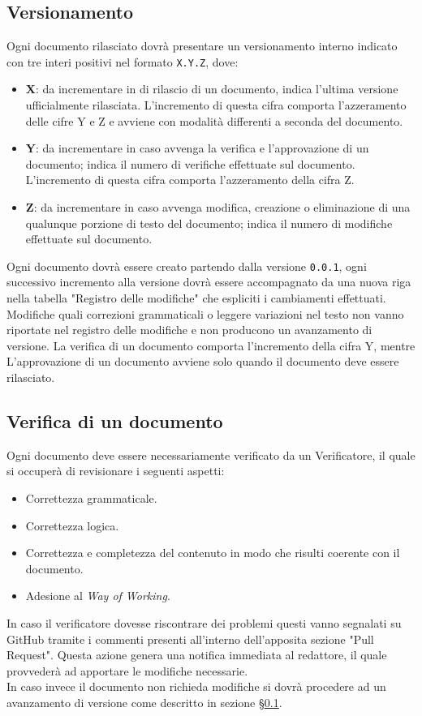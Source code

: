 \subsection{Versionamento}
\label{documentazione_versionamento}
Ogni documento rilasciato dovrà presentare un versionamento interno indicato con
tre interi positivi nel formato \texttt{X.Y.Z}, dove:
\begin{itemize}
	\item \textbf{X}: da incrementare in di rilascio di un
	      documento, indica l'ultima versione ufficialmente rilasciata.
	      L'incremento di questa cifra comporta l'azzeramento delle cifre Y e Z
	      e avviene con modalità differenti a seconda del documento.

	\item \textbf{Y}: da incrementare in caso avvenga la verifica e
	      l'approvazione di un documento; indica il numero di verifiche
	      effettuate sul documento. L'incremento di questa cifra comporta
	      l'azzeramento della cifra Z.

	\item \textbf{Z}: da incrementare in caso avvenga modifica, creazione o
	      eliminazione di una qualunque porzione di testo del documento; indica
	      il numero di modifiche effettuate sul documento.
\end{itemize}

Ogni documento dovrà essere creato partendo dalla versione \texttt{0.0.1}, ogni
successivo incremento alla versione dovrà essere accompagnato da una nuova riga
nella tabella "Registro delle modifiche" che espliciti i cambiamenti effettuati.
Modifiche quali correzioni grammaticali o leggere variazioni nel testo non vanno
riportate nel registro delle modifiche e non producono un avanzamento di
versione.
La verifica di un documento comporta l'incremento della cifra Y, mentre
L'approvazione di un documento avviene solo quando il documento deve essere
rilasciato.

\subsection{Verifica di un documento}
Ogni documento deve essere necessariamente verificato da un Verificatore, il
quale si occuperà di revisionare i seguenti aspetti:
\begin{itemize}
	\item Correttezza grammaticale.
	\item Correttezza logica.
	\item Correttezza e completezza del contenuto in modo che risulti coerente
	      con il documento.
	\item Adesione al \textit{Way of Working}.
\end{itemize}
\noindent
In caso il verificatore dovesse riscontrare dei problemi questi vanno segnalati
su GitHub tramite i commenti presenti all'interno dell'apposita sezione
"Pull Request".
Questa azione genera una notifica immediata al redattore, il quale provvederà
ad apportare le modifiche necessarie. \\
In caso invece il documento non richieda modifiche si dovrà procedere ad un
avanzamento di versione come descritto in sezione
\S\ref{documentazione_versionamento}.


